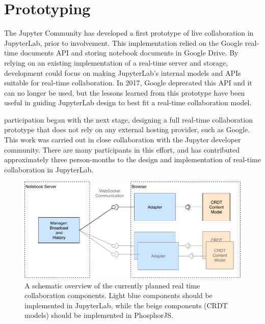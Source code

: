 \documentclass{deliverablereport}
\begin{document}





\section{Prototyping}

The Jupyter Community has developed a first prototype of live collaboration in JupyterLab,
prior to \ODK involvement.
This implementation relied on the Google real-time documents API and storing notebook documents in Google Drive.
By relying on an existing implementation of a real-time server and storage,
development could focus on making JupyterLab's
internal models and APIs suitable for real-time collaboration.
In 2017, Google deprecated this API and it can no longer be used,
but the lessons learned from this prototype have been useful in guiding JupyterLab design to best fit a real-time collaboration model.

\ODK participation began with the next stage, designing a full real-time collaboration prototype
that does not rely on any external hosting provider,
such as Google.
This work was carried out in close collaboration with the Jupyter developer community.
There are many participants in this effort, and \ODK has contributed approximately
three person-months to the design and implementation of real-time collaboration in JupyterLab.

\begin{figure}[h]
  \centering
  \includegraphics[width=.9\textwidth]{lab-RTC.pdf}
  \caption{A schematic overview of the currently planned real time collaboration components.
    Light blue components should be implemented in JupyterLab, while the beige
    components (CRDT models) should be implemented in PhosphorJS.}
  \label{fig:rtc-components}
\end{figure}
\end{document}
